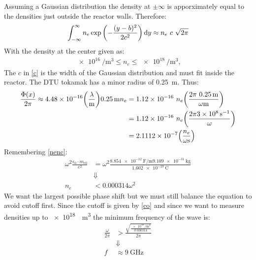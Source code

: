 Assuming a Gaussian distribution the density at \(\pm\infty\) is apporximately equal to the densities just outside the reactor walls. Therefore:
\begin{align}
	\int_{-\infty}^{\infty}n_e \exp\pqty{-\frac{(y-b)^2}{2c^2}}\dd{y} \approx n_e\ c\ \sqrt{2\pi}\label{c}
\end{align}
With the density at the center given as:
\begin{align}
	\SI{e16}{\per\meter\cubed} \leq n_e \leq \SI{e18}{\per\meter\cubed},
\end{align}
The \(c\) in \cref{c} is the width of the Gaussian distribution and must fit inside the reactor. The DTU tokamak has a minor radius of \SI{0.25}{\meter}. Thus:
\begin{align}
	\frac{\Phi(x)}{2\pi} \approx 4.48\times 10^{-16}\pqty{\frac{\lambda}{\si{\meter}}}\SI{0.25}{\meter}n_e & = 1.12\times 10^{-16}\ n_e \pqty{\frac{2\pi\ \SI{0.25}{\meter}}{\omega\si{\meter}}} \\
	                                                                                                       & = 1.12\times 10^{-16}\ n_e\pqty{\frac{2\pi\SI{3e8}{\per\second}}{\omega}}           \\
	                                                                                                       & = 2.1112\times 10^{-7}\pqty{\frac{n_e}{\omega\si{\second}}}
\end{align}
Remembering \cref{nenc}:
\begin{align}
	\omega^2\frac{\epsilon_0\cdot m_{e0}}{e^2} & = \omega^2\frac{\SI{8.854e-12}{\farad\per\meter}\SI{9.109e-31}{\kilo\gram}}{\SI{1.602e-19}{\coulomb}} \\
	                                           & \Downarrow\nonumber                                                                                   \\
	n_e                                        & < 0.000314\omega^2 \label{co}
\end{align}
We want the largest possible phase shift but we must still balance the equation to avoid cutoff first.
Since the cutoff is given by \cref{co} and since we want to measure densities up to \SI{e18}{\per\meter\cubed} the minimum frequency of the wave is:
\begin{align}
	\frac{\omega}{2\pi} & > \frac{\sqrt{\frac{\SI{e18}{\per\meter\cubed}}{0.000314}}}{2\pi} \\
	                    & \Downarrow\nonumber                                               \\
	f                   & \approx \SI{9}{\giga\hertz}
\end{align}

